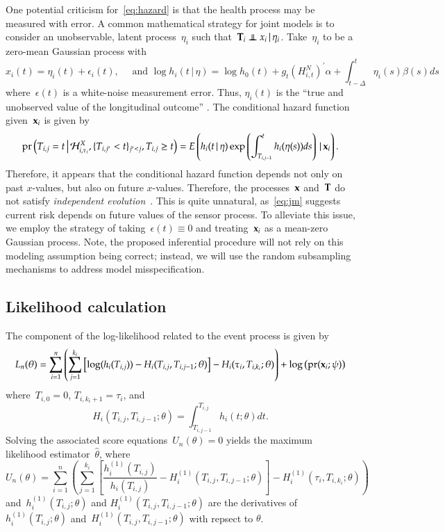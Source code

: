 \documentclass[11pt]{amsart}
\def\pr{\mathop{\text{pr}}\nolimits}
\def\pr{\mathop{\text{pr}}\nolimits}
\def\indep{\mathrel{\rlap{$\perp$}\kern1.6pt\mathord{\perp}}}
\def\H{\mathcal{H}}
\def\given{\, | \,}
\def\Given{\, \big | \,}
\def\bfx{{\bf x}}
\def\bfT{{\bf T}}
\begin{document}
One potential criticism for~\eqref{eq:hazard} is that the health
process may be measured with error.  
A common mathematical strategy for joint models is to consider an
unobservable, latent process~$\eta_i$ such that~$\bfT_i \indep x_i
\given \eta_i$. Take~$\eta_i$ to be a zero-mean Gaussian process with 
\begin{equation}\label{eq:jm}
x_i(t) = \eta_i (t) + \epsilon_i (t),\quad \text{ and } \log h_i (t
\given \eta ) = \log h_0 (t) + g_t \left( H_{i,t}^N \right)^{\prime}
\alpha + \int_{t-\Delta}^t \eta_i (s) \beta (s) ds
\end{equation}
where~$\epsilon (t)$ is a white-noise measurement error. Thus,
$\eta_i (t)$ is the ``true and unobserved value of the longitudinal
outcome'' \citep[Sec. 2.1, pp.3]{Rizopoulos2010}. The conditional hazard
function given~$\bfx_i$ is given by
\[
\pr \left ( T_{i,j} = t \Given \H_{i,\tau_i}^X, \{ T_{i,j^\prime} < t \}_{j^\prime <
  j}, T_{i,j} \geq t \right) = E \left( h_i (t \given \eta) \exp
\left( \int_{T_{i,j-1}}^t h_i (\eta (s)) ds \right) \given \bfx_i
\right).
\]
Therefore, it appears that the conditional hazard function depends 
not only on past $x$-values, but also on future $x$-values.
Therefore, the processes~$\bfx$ and~$\bfT$ do not satisfy
\emph{independent evolution}~\citep{DempseyPMCC2}.
This is quite unnatural, as~\eqref{eq:jm} suggests current risk
depends on future values of the sensor process.
To alleviate this issue, we employ the strategy of taking~$\epsilon
(t) \equiv 0$ and treating~$\bfx_i$ as a mean-zero Gaussian process.
Note, the proposed inferential procedure will not rely on this
modeling assumption being correct; instead, we will use the random
subsampling mechanisms to address model misspecification.

\subsection{Likelihood calculation}  

The component of the log-likelihood related to the event process
is given by
\[
  L_n (\theta) = \sum_{i=1}^{n} \left ( \sum_{j=1}^{k_i} 
  \left[ \log ( h_i (T_{i,j}) ) - H_i (T_{i,j}, T_{i,j-1}; \theta)
  \right] - H_{i} (\tau_i, T_{i,k_i}; \theta) \right) + \log \left(
  \pr ( \bfx_i ; \psi ) \right)
\]
where~$T_{i,0} = 0$, $T_{i, k_i + 1} = \tau_i$, and
\[
H_{i} (T_{i,j}, T_{i,j-1}; \theta) = \int_{T_{i,j-1}}^{T_{i,j}} h_{i} (t; \theta) dt.
\]
Solving the associated score equations~$U_n (\theta) = 0$ yields the
maximum likelihood estimator~$\hat \theta$, where
\[
U_n (\theta) = \sum_{i=1}^{n} \left ( \sum_{j=1}^{k_i} 
  \left[ \frac{h^{(1)}_i (T_{i,j})}{h_i (T_{i,j})} - H^{(1)}_i
    (T_{i,j}, T_{i,j-1}; \theta) \right]  - H^{(1)}_{i} (\tau_i,
  T_{i,k_i}; \theta) \right) 
\]
and~$h_i^{(1)} (T_{i,j}; \theta)$ and $H_i^{(1)} (T_{i,j}, T_{i,j-1}; \theta)$
are the derivatives of~$h_i^{(1)} (T_{i,j}; \theta)$ and~$H_i^{(1)}
(T_{i,j}, T_{i,j-1}; \theta)$ with repsect to $\theta$.
\end{document}
